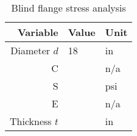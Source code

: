\begin{table}[h]
\begin{center}
\tabcolsep=10pt
\begin{tabular}{r|l|l}
\hline
\hline
Variable & Value & Unit \\
\hline
Diameter $d$ & 18 & in \\
C & & n/a \\
S & & psi \\
E & & n/a \\
\hline
Thickness $t$ & & in \\
\hline
\hline
\end{tabular}
\caption{Blind flange stress analysis}
\label{table:blind_flange_stress}
\end{center}
\end{table}

